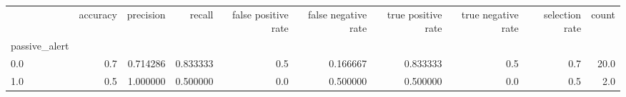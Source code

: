 \begin{tabular}{lrrrrrrrrr}
\toprule
{} &  accuracy &  precision &    recall &  false positive rate &  false negative rate &  true positive rate &  true negative rate &  selection rate &  count \\
passive\_alert &           &            &           &                      &                      &                     &                     &                 &        \\
\midrule
0.0           &       0.7 &   0.714286 &  0.833333 &                  0.5 &             0.166667 &            0.833333 &                 0.5 &             0.7 &   20.0 \\
1.0           &       0.5 &   1.000000 &  0.500000 &                  0.0 &             0.500000 &            0.500000 &                 0.0 &             0.5 &    2.0 \\
\bottomrule
\end{tabular}
